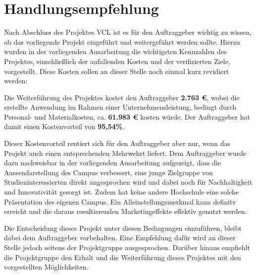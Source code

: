 \section{Handlungsempfehlung}
\label{sec:Handlungsempfehlung}

Nach Abschluss des Projektes \ac{VCL} ist es für den Auftraggeber wichtig zu wissen,
ob das vorliegende Projekt eingeführt und weitergeführt werden sollte.
Hierzu wurden in der vorliegenden Ausarbeitung die wichtigsten Kennzahlen des Projektes,
einschließlich der anfallenden Kosten und der verifizierten Ziele, vorgestellt.
Diese Kosten sollen an dieser Stelle noch einmal kurz revidiert werden:

Die Weiterführung des Projektes kostet den Auftraggeber \textbf{2.763 €}, wobei
die erstellte Anwendung im Rahmen einer Unternehmensleistung, bedingt
durch Personal- und Materialkosten, ca. \textbf{61.983 €} kosten würde.
Der Auftraggeber hat damit einen Kostenvorteil von \textbf{95,54\%}.

Dieser Kostenvorteil rentiert sich für den Auftraggeber aber nur, wenn
das Projekt auch einen entsprechenden Mehrwehrt liefert.
Dem Auftraggeber wurde dazu nachweisbar in der vorliegenden Ausarbeitung aufgezeigt,
dass die Aussendarstellung des Campus verbessert, eine junge Zielgruppe
von Studieninteressierten direkt angesprochen wird und dabei noch für
Nachhaltigkeit und Innovativität gesorgt ist. Zudem hat keine andere
Hochschule eine solche Präsentation des eigenen Campus. Ein Alleinstellungsmerkmal
kann definitv erreicht und die daraus resultierenden Marketingeffekte effektiv genutzt werden.

Die Entscheidung dieses Projekt unter diesen Bedingungen einzuführen,
bleibt dabei dem Auftraggeber vorbehalten. Eine Empfehlung dafür wird an dieser
Stelle jedoch seitens der Projektgruppe ausgesprochen. Darüber hinaus empfiehlt die
Projektgruppe  den Erhalt und die Weiterführung dieses Projektes mit den vorgestellten Möglichkeiten.